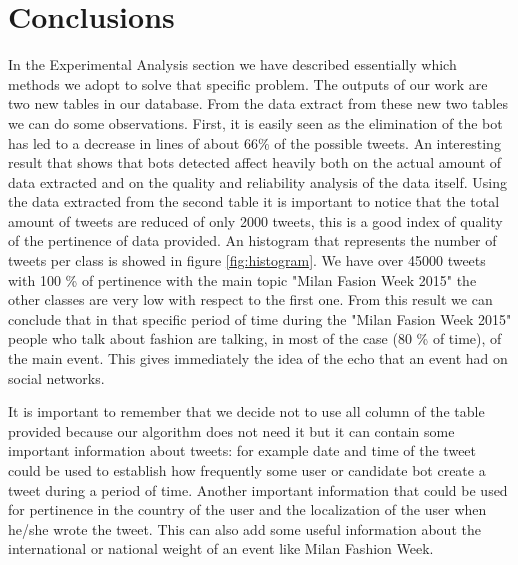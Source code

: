 \documentclass[conference, onecolumn]{IEEEtran}
\begin{document}
\section{Conclusions}\label{sec:conclusions}
In the Experimental Analysis section we have described essentially which methods we adopt to solve that specific problem. The outputs of our work are two new tables in our database. From the data extract from these new two tables we can do some observations. First, it is easily seen as the elimination of the bot has led to a decrease in lines of about 66\% of the possible tweets. An interesting result that shows that bots detected affect heavily both on the actual amount of data extracted and on the quality and reliability analysis of the data itself. Using the data extracted from the second table it is important to notice that the total amount of tweets are reduced of only 2000 tweets, this is a good index of quality of the pertinence of data provided. An histogram that represents the number of tweets per class is showed in figure \ref{fig:histogram}. We have over 45000 tweets with 100 \% of pertinence with the main topic "Milan Fasion Week 2015" the other classes are very low with respect to the first one. From this result we can conclude that in that specific period of time during the "Milan Fasion Week 2015" people who talk about fashion are talking, in most of the case (80 \% of time), of the main event. This gives immediately the idea of the echo that an event had on social networks.
\medskip

It is important to remember that we decide not to use all column of the table provided because our algorithm does not need it but it can contain some important information about tweets: for example date and time of the tweet could be used to establish how frequently some user or candidate bot create a tweet during a period of time. Another important information that could be used for pertinence in the country of the user and the localization of the user when he/she wrote the tweet. This can also add some useful information about the international or national weight of an event like Milan Fashion Week.
\medskip
\end{document}
